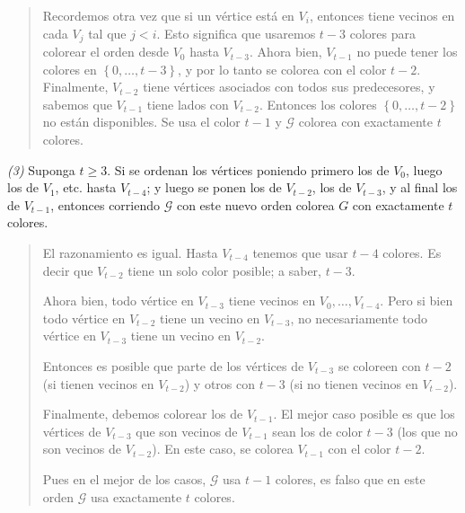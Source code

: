 \documentclass[a4paper]{article}
\begin{document}
\small
\begin{quote}

    Recordemos otra vez que si un vértice está en $V_i$, entonces tiene vecinos
    en cada $V_{j}$ tal que $j < i$. Esto significa que usaremos $t - 3$ colores
    para colorear el orden desde $V_0$ hasta $V_{t - 3}$. Ahora bien, $V_{t -
    1}$ no puede tener los colores en $\left\{ 0, \ldots, t - 3 \right\} $, y
    por lo tanto se colorea con el color $t - 2$. Finalmente, $V_{t - 2}$ tiene
    vértices asociados con todos sus predecesores, y sabemos que $V_{t - 1}$
    tiene lados con $V_{t - 2}$. Entonces los colores $\left\{ 0, \ldots, t - 2
    \right\} $ no están disponibles. Se usa el color $t - 1$ y $\mathscr{G}$ colorea
    con exactamente $t$ colores.

\end{quote}
\normalsize

\textit{(3)} Suponga $t \geq 3$. Si se ordenan los vértices poniendo primero los
de $V_0$, luego los de $V_1$, etc. hasta $V_{t - 4}$; y luego se ponen los de
$V_{t-2}$, los de $V_{t - 3}$, y al final los de $V_{t - 1}$, entonces corriendo
$\mathscr{G}$ con este nuevo orden colorea $G$ con exactamente $t$ colores.



\small
\begin{quote}

    El razonamiento es igual. Hasta $V_{t - 4}$ tenemos que usar $t - 4$
    colores. Es decir que $V_{t - 2}$ tiene un solo color posible; a saber, $t -
    3$. 

    Ahora bien, todo vértice en $V_{t - 3}$ tiene vecinos en $V_0, \ldots, V_{t
    - 4}$. Pero si bien todo vértice en $V_{t - 2}$ tiene un vecino en $V_{t -
    3}$, no necesariamente todo vértice en $V_{t -3}$ tiene un vecino en $V_{t
    -2}$. 

    Entonces es posible que parte de los vértices de $V_{t-3}$ se coloreen con
    $t - 2$ (si tienen vecinos en $V_{t-2}$) y otros con $t - 3$ (si no tienen
    vecinos en $V_{t-2}$).

    Finalmente, debemos colorear los de $V_{t - 1}$. El mejor caso posible es
    que los vértices de $V_{t - 3}$ que son vecinos de $V_{t -
    1}$ sean los de color $t - 3$ (los que no son vecinos de $V_{t - 2}$). En
    este caso, se colorea $V_{t - 1}$ con el color $t - 2$.

    Pues en el mejor de los casos, $\mathscr{G}$ usa $t - 1$ colores, es falso que en
    este orden $\mathscr{G}$ usa exactamente $t$ colores.


\end{quote}
\normalsize
\end{document}
